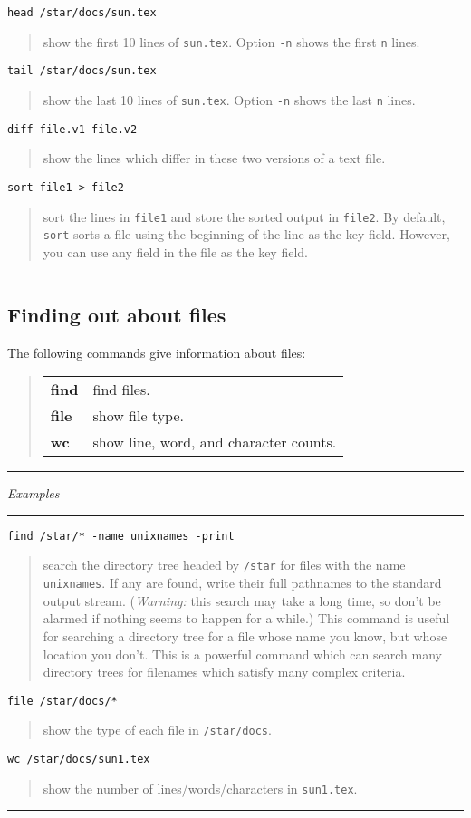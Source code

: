 \documentclass[twoside,11pt]{article}
\newcommand{\example}[2]{\goodbreak
                         {\tt #1}
                         \vspace*{-4mm}
                         \begin{quote}
                           {\small #2}
                         \end{quote}
                        }
\newcommand{\example}[2]{\goodbreak
                            {\tt #1}
                            \vspace*{-4mm}
                            \begin{quote}
                            {#2}
                            \end{quote}
                           }
\newcommand{\exbegin}{\begin{center}
                      \rule{18mm}{0.3mm}
                      {\em Examples}
                      \rule{18mm}{0.3mm}
                      \end{center}
                     }
\newcommand{\exend}{\begin{center}
                    \rule{50mm}{0.3mm}
                    \end{center}
                   }
\begin{document}
\example{head /star/docs/sun.tex}
{show the first 10 lines of {\tt sun.tex}.
Option {\tt -n} shows the first {\tt n} lines.}

\example{tail /star/docs/sun.tex}
{show the last 10 lines of {\tt sun.tex}.
Option {\tt -n} shows the last {\tt n} lines.}

\example{diff file.v1 file.v2}
{show the lines which differ in these two versions of a text file.}

\example{sort file1 > file2}
{sort the lines in {\tt file1} and store the sorted output in {\tt file2}.
By default, {\tt sort} sorts a file using the beginning of the line as the
key field.
However, you can use any field in the file as the key field.}

\exend

\subsection{Finding out about files}

The following commands give information about files:

\begin{quote}
\begin{tabular}{lp{67mm}}

{\bf find} & find files.\\
{\bf file} & show file type.\\
{\bf wc}   & show line, word, and character counts.

\end{tabular}
\end{quote}

\exbegin

\example{find /star/* -name unixnames -print}
{search the directory tree headed by {\tt /star} for files with the name
{\tt unixnames}.
If any are found, write their full pathnames to the standard output stream.
({\em Warning:}\/ this search may take a long time, so don't be alarmed if
nothing seems to happen for a while.)
This command is useful for searching a directory tree for a file whose
name you know, but whose location you don't.
This is a powerful command which can search many directory trees for filenames
which satisfy many complex criteria.}

\example{file /star/docs/*}
{show the type of each file in {\tt /star/docs}.}

\example{wc /star/docs/sun1.tex}
{show the number of lines/words/characters in {\tt sun1.tex}.}

\exend
\end{document}
